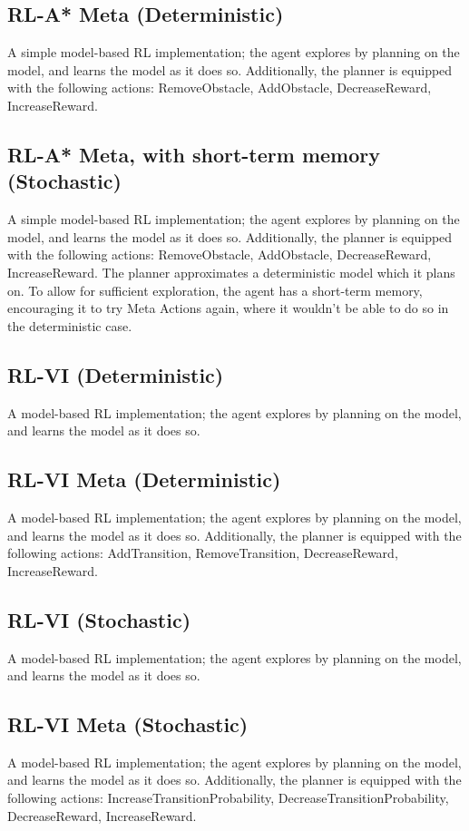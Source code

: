 \subsection{RL-A* Meta (Deterministic)}
A simple model-based RL implementation; the agent explores by planning on the model, and learns the model as it does so.
Additionally, the planner is equipped with the following actions: RemoveObstacle, AddObstacle, DecreaseReward, IncreaseReward.
\subsection{RL-A* Meta, with short-term memory (Stochastic)}
A simple model-based RL implementation; the agent explores by planning on the model, and learns the model as it does so.
Additionally, the planner is equipped with the following actions: RemoveObstacle, AddObstacle, DecreaseReward, IncreaseReward. The planner approximates a deterministic model which it plans on. To allow for sufficient exploration, the agent has a short-term memory, encouraging it to try Meta Actions again, where it wouldn't be able to do so in the deterministic case.
\subsection{RL-VI (Deterministic)}
A model-based RL implementation; the agent explores by planning on the model, and learns the model as it does so.
\subsection{RL-VI Meta (Deterministic)}
A model-based RL implementation; the agent explores by planning on the model, and learns the model as it does so.
Additionally, the planner is equipped with the following actions: AddTransition, RemoveTransition, DecreaseReward, IncreaseReward.
\subsection{RL-VI (Stochastic)}
A model-based RL implementation; the agent explores by planning on the model, and learns the model as it does so.
\subsection{RL-VI Meta (Stochastic)}
A model-based RL implementation; the agent explores by planning on the model, and learns the model as it does so.
Additionally, the planner is equipped with the following actions: IncreaseTransitionProbability, DecreaseTransitionProbability, DecreaseReward, IncreaseReward.
